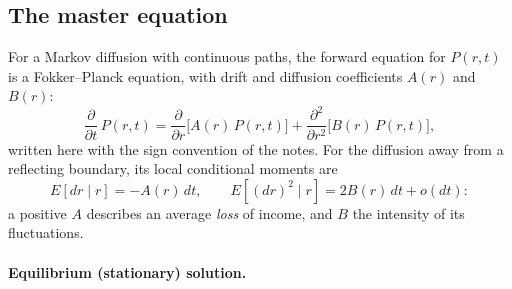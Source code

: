 \subsection{The master equation}

For a Markov diffusion with continuous paths, the forward equation for $P(r,t)$ is a Fokker--Planck equation, with drift and diffusion coefficients $A(r)$ and $B(r)$:
\begin{equation}\label{eq:fp-income}
\frac{\partial}{\partial t}\, P(r,t) = \frac{\partial}{\partial r}\bigl[A(r)\, P(r,t)\bigr] + \frac{\partial^2}{\partial r^2}\bigl[B(r)\, P(r,t)\bigr],
\end{equation}
written here with the sign convention of the notes.
For the diffusion away from a reflecting boundary, its local conditional moments are
\begin{equation}
 E[dr\mid r]=-A(r)\,dt,\qquad E[(dr)^2\mid r]=2B(r)\,dt+o(dt):
\end{equation}
a positive $A$ describes an average \emph{loss} of income, and $B$ the intensity of its fluctuations.

\paragraph*{Equilibrium (stationary) solution.}

